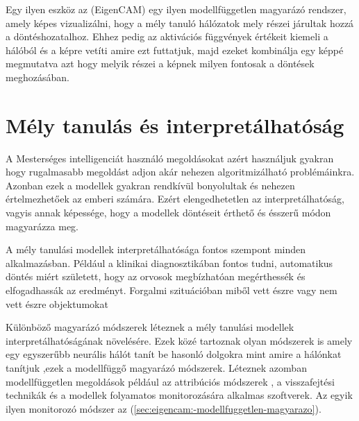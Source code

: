 \documentclass[12pt,oneside,a4paper]{article}
\newcommand{\newsection}[1]{\clearpage\section{#1}}\label{makro}
\theoremstyle{remark}
\begin{document}
    Egy ilyen eszköz az  (\gls{EigenCAM}) egy ilyen modellfüggetlen magyarázó rendszer,
    amely képes vizualizálni, hogy a mély tanuló hálózatok mely részei járultak hozzá a döntéshozatalhoz.
    Ehhez pedig
    az aktivációs függvények értékeit kiemeli a hálóból és a képre vetíti amire ezt futtatjuk, majd ezeket kombinálja
    egy képpé megmutatva azt hogy melyik részei a képnek milyen fontosak a döntések meghozásában.

\newsection{Mély tanulás és interpretálhatóság}\label{sec:mely-tanulas-es-interpretalhatosag}
A Mesterséges intelligenciát használó megoldásokat azért használjuk gyakran hogy rugalmasabb megoldást adjon akár
nehezen algoritmizálható problémáinkra.
Azonban ezek a modellek gyakran rendkívül bonyolultak és nehezen
 értelmezhetőek az emberi számára.
 Ezért elengedhetetlen az interpretálhatóság, vagyis annak képessége, hogy a modellek
döntéseit érthető és ésszerű módon magyarázza meg.

 A mély tanulási modellek interpretálhatósága fontos szempont minden alkalmazásban.
 Például a klinikai diagnosztikában
fontos tudni,
 automatikus döntés miért született, hogy az orvosok megbízhatóan megérthessék és elfogadhassák az eredményt.
 Forgalmi
szituációban miből vett észre vagy nem vett észre objektumokat

    Különböző magyarázó módszerek léteznek a mély tanulási modellek interpretálhatóságának növelésére.
    Ezek közé
tartoznak olyan módszerek is amely egy egyszerűbb
neurális hálót tanít be hasonló dolgokra mint amire a hálónkat tanítjuk ,ezek a modellfüggő magyarázó módszerek.
Léteznek azomban modellfüggetlen megoldások például az attribúciós módszerek
, a visszafejtési technikák és a modellek folyamatos monitorozására alkalmas szoftverek.
Az egyik ilyen monitorozó módszer az  (\ref{sec:eigencam:-modellfuggetlen-magyarazo})\label{sechiv}.
\end{document}
